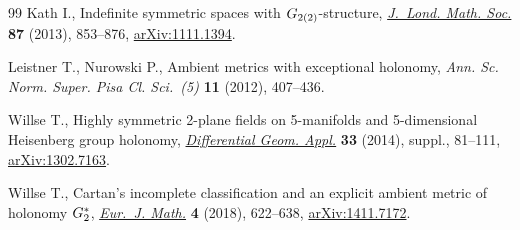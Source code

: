 \documentclass[11pt]{article}
\numberwithin{equation}{section}
\begin{document}
\begin{thebibliography}{99}
Kath I., Indefinite symmetric spaces with {$\rm G_{2(2)}$}-structure,
 \href{https://doi.org/10.1112/jlms/jds068}{\textit{J.~Lond. Math. Soc.}} \textbf{87} (2013), 853--876,
 \href{https://arxiv.org/abs/1111.1394}{arXiv:1111.1394}.

Leistner T., Nurowski P., Ambient metrics with exceptional holonomy,
 \textit{Ann. Sc. Norm. Super. Pisa Cl. Sci.~(5)} \textbf{11} (2012),
 407--436.

Willse T., Highly symmetric 2-plane fields on 5-manifolds and 5-dimensional
 {H}eisenberg group holonomy, \href{https://doi.org/10.1016/j.difgeo.2013.10.010}{\textit{Differential Geom. Appl.}} \textbf{33}
 (2014), suppl., 81--111, \href{https://arxiv.org/abs/1302.7163}{arXiv:1302.7163}.

Willse T., Cartan's incomplete classification and an explicit ambient metric of
 holonomy {$\rm G_2^*$}, \href{https://doi.org/10.1007/s40879-017-0178-9}{\textit{Eur.~J. Math.}} \textbf{4} (2018), 622--638,
 \href{https://arxiv.org/abs/1411.7172}{arXiv:1411.7172}.

\end{thebibliography}
\end{document}
